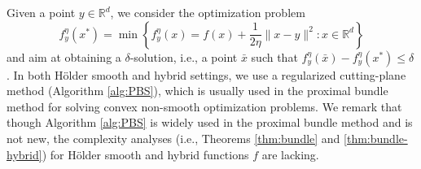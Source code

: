 \documentclass[11pt,letterpaper]{article}
\newcommand{\chen}{\color{cyan}}
\newcommand{\R}{\mathbb{R}}
\newcommand{\inner}[2]{\langle #1,#2\rangle}
\newcommand{\argmin}{\mathrm{argmin}\,}
\newcommand{\tx}{\tilde x}
\begin{document}
Given a point $y\in \R^d$, we consider the optimization problem
\begin{equation}\label{eq:subproblem}
    f_y^\eta (x^*)= \min \left\{ f_y^\eta(x)= f(x) + \frac{1}{2\eta}\|x-y\|^2: x\in \R^d\right \}
\end{equation}
and aim at obtaining a $\delta$-solution, i.e., a point $\bar x$ such that $f_y^\eta(\bar x) - f_y^\eta(x^*) \le \delta$.
In both Hölder smooth and hybrid settings, we use a regularized cutting-plane method (Algorithm \ref{alg:PBS}), which is usually used in the proximal bundle method \cite{liang2020proximal,liang2024unified} for solving convex non-smooth optimization problems. 
We remark that though Algorithm \ref{alg:PBS} is widely used in the proximal bundle method and is not new, the complexity analyses (i.e., Theorems \ref{thm:bundle} and \ref{thm:bundle-hybrid}) for Hölder smooth and hybrid functions $f$ are lacking. 



\end{document}
